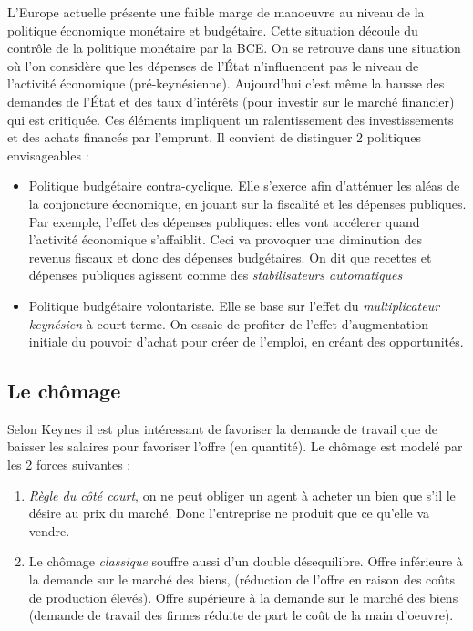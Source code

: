 L'Europe actuelle présente une faible marge de manoeuvre au niveau de la politique économique monétaire et budgétaire. Cette situation découle du contrôle de 
la politique monétaire par la BCE. On se retrouve dans une situation où l'on considère que les dépenses de l'État n'influencent pas le niveau de l'activité 
économique (pré-keynésienne). Aujourd'hui c'est même la hausse des demandes de l'État et des taux d'intérêts (pour investir sur le marché financier) qui est 
critiquée. Ces éléments impliquent un ralentissement des investissements et des achats financés par l'emprunt. Il convient de distinguer 2 politiques 
envisageables : 
\begin{itemize}[label=]
	\item Politique budgétaire contra-cyclique. Elle s'exerce afin d'atténuer les aléas de la conjoncture économique, en jouant sur la fiscalité et les 
	dépenses publiques. Par exemple, l'effet des dépenses publiques: elles vont accélerer quand l'activité économique s'affaiblit. Ceci va provoquer une 
	diminution des revenus fiscaux et donc des dépenses budgétaires. On dit que recettes et dépenses publiques agissent comme des \emph{stabilisateurs
	automatiques}
	\item Politique budgétaire volontariste. Elle se base sur l'effet du \emph{multiplicateur keynésien} à court terme. On essaie de profiter de l'effet
	d'augmentation initiale du pouvoir d'achat pour créer de l'emploi, en créant des opportunités. 
\end{itemize}


\subsection{Le chômage} %
\label{sub:le_chomage}

Selon Keynes il est plus intéressant de favoriser la demande de travail que de baisser les salaires pour favoriser l'offre (en quantité).
Le chômage est modelé par les 2 forces suivantes : 
\begin{enumerate}
	\item \emph{Règle du côté court}, on ne peut obliger un agent à acheter un bien que s'il le désire au prix du marché. Donc l'entreprise ne produit que ce 
	qu'elle va vendre.
	\item Le chômage \emph{classique} souffre aussi d'un double désequilibre. Offre inférieure à la demande sur le marché des biens, (réduction de l'offre
	en raison des coûts de production élevés). Offre supérieure à la demande sur le marché des biens (demande de travail des firmes réduite de part 
	le coût de la main d'oeuvre).
\end{enumerate}

